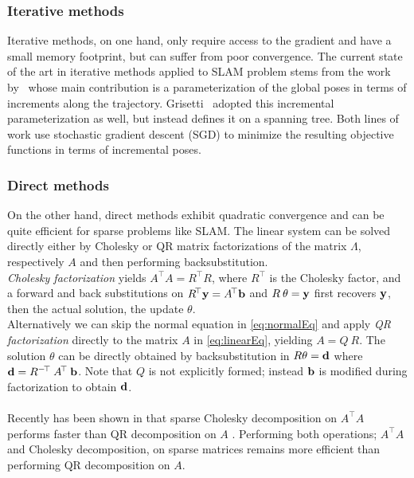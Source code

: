 \documentclass{article}
\newcommand{\tr}{^{\!\top}}
\newcommand{\invtr}{^{-\!\top}}
\begin{document}
{\subsubsection*{Iterative methods}
Iterative methods, on one hand, only require access to the gradient and have a small memory footprint, but can suffer from poor convergence.
The current state of the art in iterative methods applied to SLAM problem stems from the work
by~\cite{Olson06icra} whose main contribution is a parameterization of the global poses in terms of increments along the trajectory.
Grisetti~\cite{Grisetti07rss,Grisetti10iros} adopted this incremental parameterization as well, but instead defines it on a spanning tree. Both lines of
work use stochastic gradient descent (SGD) to minimize the resulting objective functions in terms of incremental poses.
\subsubsection*{Direct methods}
On the other hand, direct methods exhibit quadratic convergence and can be quite efficient for sparse problems like SLAM. 
The linear system can be solved directly either by Cholesky or QR matrix factorizations of the matrix $\Lambda$, respectively
 $A$ and  then performing backsubstitution. 
 \\
\emph{Cholesky factorization} yields $A\tr A =R\tr R$, where $R\tr$ is the Cholesky factor, and a forward and back substitutions on $R\tr {\bf y} = A\tr  {\bf b}$ and
$R\:\theta = {\bf y}$ first recovers ${\bf y}$, then the actual solution, the update $\theta$.
\\
Alternatively we can skip the normal equation in \ref{eq:normalEq} and apply\emph{ QR factorization} directly to the matrix $A$ in \ref{eq:linearEq}, yielding $A = Q\:R$. The solution $\theta$ can be directly obtained by backsubstitution in $R\theta = {\bf d}$ where ${\bf d}=R\invtr\:A\tr\:{\bf b}$. Note that $Q$ is not explicitly formed; instead ${\bf b}$ is modified during factorization to obtain $\bf d$.\\
\\
Recently has been shown in \cite{Konolige10iros} that sparse Cholesky decomposition on $A\tr A$ performs faster than QR decomposition on $A$ . 
Performing both operations; $A\tr A$ and Cholesky decomposition, on sparse matrices remains more efficient than performing QR decomposition on $A$.
\\
}
\end{document}
